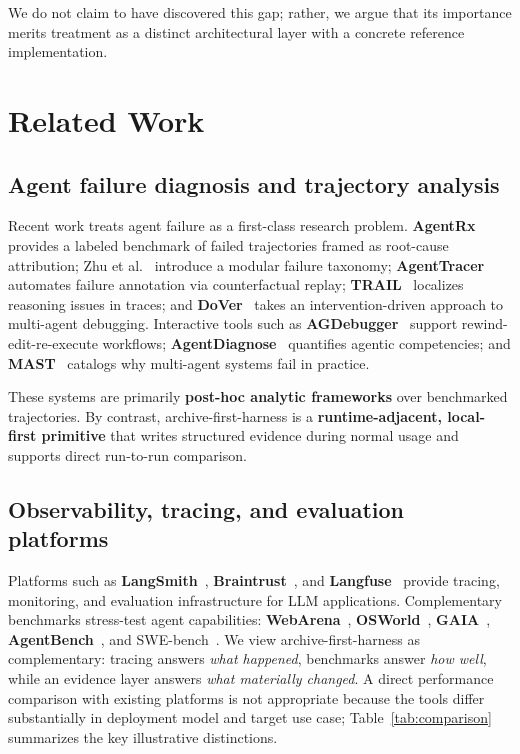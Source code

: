 \documentclass[11pt]{article}
\begin{document}
We do not claim to have discovered this gap; rather, we argue that its importance merits treatment as a distinct architectural layer with a concrete reference implementation.

\section{Related Work}

\subsection{Agent failure diagnosis and trajectory analysis}

Recent work treats agent failure as a first-class research problem. \textbf{AgentRx}~\cite{barke2026agentrx} provides a labeled benchmark of failed trajectories framed as root-cause attribution; Zhu et al.~\cite{zhu2025agentdebug} introduce a modular failure taxonomy; \textbf{AgentTracer}~\cite{li2025agentracer} automates failure annotation via counterfactual replay; \textbf{TRAIL}~\cite{rao2025trail} localizes reasoning issues in traces; and \textbf{DoVer}~\cite{ma2025dover} takes an intervention-driven approach to multi-agent debugging. Interactive tools such as \textbf{AGDebugger}~\cite{epperson2025debugging} support rewind-edit-re-execute workflows; \textbf{AgentDiagnose}~\cite{ou2025agentdiagnose} quantifies agentic competencies; and \textbf{MAST}~\cite{cemri2025mast} catalogs why multi-agent systems fail in practice.

These systems are primarily \textbf{post-hoc analytic frameworks} over benchmarked trajectories. By contrast, archive-first-harness is a \textbf{runtime-adjacent, local-first primitive} that writes structured evidence during normal usage and supports direct run-to-run comparison.

\subsection{Observability, tracing, and evaluation platforms}

Platforms such as \textbf{LangSmith}~\cite{langsmith}, \textbf{Braintrust}~\cite{braintrust}, and \textbf{Langfuse}~\cite{langfuse} provide tracing, monitoring, and evaluation infrastructure for LLM applications. Complementary benchmarks stress-test agent capabilities: \textbf{WebArena}~\cite{zhou2024webarena}, \textbf{OSWorld}~\cite{xie2024osworld}, \textbf{GAIA}~\cite{mialon2024gaia}, \textbf{AgentBench}~\cite{liu2024agentbench}, and SWE-bench~\cite{jimenez2024swebench}. We view archive-first-harness as complementary: tracing answers \emph{what happened}, benchmarks answer \emph{how well}, while an evidence layer answers \emph{what materially changed}. A direct performance comparison with existing platforms is not appropriate because the tools differ substantially in deployment model and target use case; Table~\ref{tab:comparison} summarizes the key illustrative distinctions.
\end{document}
